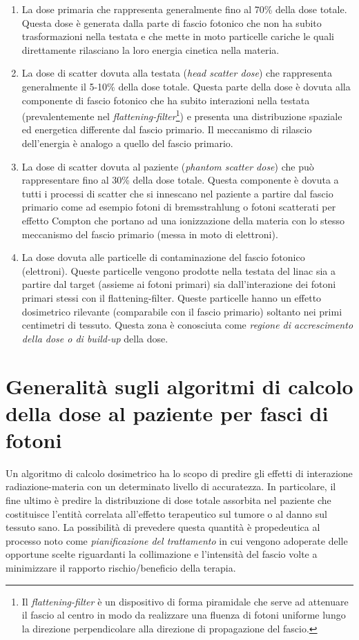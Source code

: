 \begin{enumerate}
\item La dose primaria che rappresenta generalmente fino al 70\% della dose totale. Questa dose è generata dalla parte di fascio fotonico che non ha subito trasformazioni nella testata e che mette in moto particelle cariche le quali direttamente rilasciano la loro energia cinetica nella materia.
\item La dose di scatter dovuta alla testata (\textit{head scatter dose}) che rappresenta generalmente il 5-10\% della dose totale. Questa parte della dose è dovuta alla componente di fascio fotonico che ha subito interazioni nella testata (prevalentemente nel \textit{flattening-filter}\footnote{\label{foot:flatt} Il \textit{flattening-filter} è un dispositivo di forma piramidale che serve ad attenuare il fascio al centro in modo da realizzare una fluenza di fotoni uniforme lungo la direzione perpendicolare alla direzione di propagazione del fascio.}) e presenta una distribuzione spaziale ed energetica differente dal fascio primario. Il meccanismo di rilascio dell'energia è analogo a quello del fascio primario.
\item La dose di scatter dovuta al paziente (\textit{phantom scatter dose}) che può rappresentare fino al 30\% della dose totale. Questa componente è dovuta a tutti i processi di scatter che si innescano nel paziente a partire dal fascio primario come ad esempio fotoni di bremsstrahlung o fotoni scatterati per effetto Compton che portano ad una ionizzazione della materia con lo stesso meccanismo del fascio primario (messa in moto di elettroni).
\item La dose dovuta alle particelle di contaminazione del fascio fotonico (elettroni). Queste particelle vengono prodotte nella testata del linac sia a partire dal target (assieme ai fotoni primari) sia dall'interazione dei fotoni primari stessi con il flattening-filter. Queste particelle hanno un effetto dosimetrico rilevante (comparabile con il fascio primario) soltanto nei primi centimetri di tessuto. Questa zona è conosciuta come \textit{regione di accrescimento della dose o di build-up} della dose.
\end{enumerate}


\section{Generalità sugli algoritmi di calcolo della dose al paziente per fasci di fotoni}
Un algoritmo di calcolo dosimetrico ha lo scopo di predire gli effetti di interazione radiazione-materia con un determinato livello di accuratezza. In particolare, il fine ultimo è predire la distribuzione di dose totale assorbita nel paziente che costituisce l'entità correlata all'effetto terapeutico sul tumore o al danno sul tessuto sano. La possibilità di prevedere questa quantità è propedeutica al processo noto come \textit{pianificazione del trattamento} in cui vengono adoperate delle opportune scelte riguardanti la collimazione e l'intensità del fascio volte a minimizzare il rapporto rischio/beneficio della terapia.

